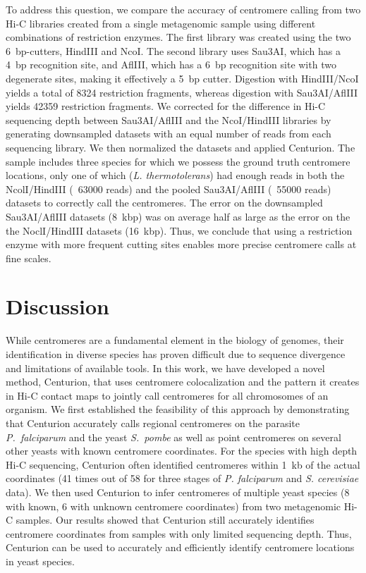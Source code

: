 To address this question, we compare the accuracy of centromere calling from
two Hi-C libraries created from a single metagenomic sample using different
combinations of restriction enzymes. The first library was created using the
two 6~bp-cutters, HindIII and NcoI. The second library uses Sau3AI, which has a
4~bp recognition site, and AflIII, which has a 6~bp recognition site with two
degenerate sites, making it effectively a 5~bp cutter. Digestion with
HindIII/NcoI yields a total of 8324 restriction fragments, whereas digestion
with Sau3AI/AflIII yields 42359 restriction fragments. We corrected for the
difference in Hi-C sequencing depth between Sau3AI/AflIII and the NcoI/HindIII
libraries by generating downsampled datasets with an equal number of reads
from each sequencing library. We then normalized the datasets and applied
Centurion. The sample includes three species for which we possess the ground
truth centromere locations, only one of which (\textit{L. thermotolerans})
had enough reads in both the NcolI/HindIII (~63000 reads) and the pooled
Sau3AI/AflIII (~55000 reads) datasets to correctly call the centromeres. The
error on the downsampled Sau3AI/AflIII datasets (8~kbp) was on average half as
large as the error on the the NoclI/HindIII datasets (16~kbp). Thus, we
conclude that using a restriction enzyme with more frequent cutting sites
enables more precise centromere calls at fine scales.

\section{Discussion}

While centromeres are a fundamental element in the biology of genomes, their
identification in diverse species has proven difficult due to sequence
divergence and limitations of available tools. In this work, we have
developed a novel method, Centurion, that uses centromere colocalization and
the pattern it creates in Hi-C contact maps to jointly call centromeres for
all chromosomes of an organism.
We first established the feasibility of this approach by demonstrating
that Centurion accurately calls regional centromeres on the parasite
\textit{P.\ falciparum} and the yeast \textit{S.\ pombe} as well as
point centromeres on several other yeasts with known centromere
coordinates.
For the species with high depth Hi-C sequencing, Centurion often identified
centromeres within 1~kb of the actual coordinates (41 times out of 58 for
three stages of \textit{P. falciparum} and \textit{S. cerevisiae} data). We
then used Centurion to infer centromeres of multiple yeast species (8 with
known, 6 with unknown centromere coordinates) from two metagenomic Hi-C
samples. Our results showed that Centurion still accurately identifies
centromere coordinates from samples with only limited sequencing depth. Thus,
Centurion can be used to accurately and efficiently identify centromere
locations in yeast species.

